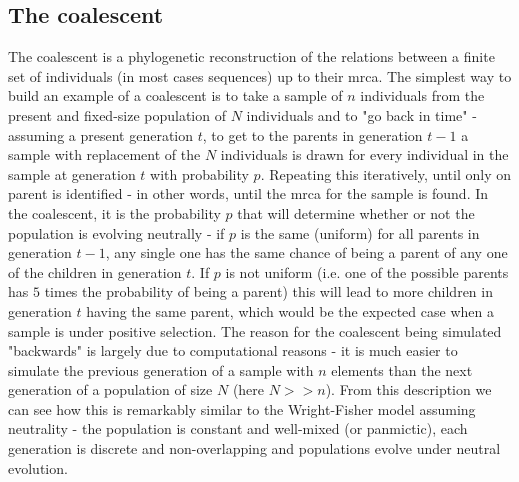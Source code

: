 \subsection{The coalescent}

The coalescent is a phylogenetic reconstruction of the relations between a finite set of individuals (in most cases sequences) up to their \ac{mrca}. The simplest way to build an example of a coalescent is to take a sample of $n$ individuals from the present and fixed-size population of $N$ individuals and to "go back in time" - assuming a present generation $t$, to get to the parents in generation $t-1$ a sample with replacement of the $N$ individuals is drawn for every individual in the sample at generation $t$ with probability $p$. Repeating this iteratively, until only on parent is identified - in other words, until the \ac{mrca} for the sample is found. In the coalescent, it is the probability $p$ that will determine whether or not the population is evolving neutrally - if $p$ is the same (uniform) for all parents in generation $t-1$, any single one has the same chance of being a parent of any one of the children in generation $t$. If $p$ is not uniform (i.e. one of the possible parents has $5$ times the probability of being a parent) this will lead to more children in generation $t$ having the same parent, which would be the expected case when a sample is under positive selection. The reason for the coalescent being simulated "backwards" is largely due to computational reasons - it is much easier to simulate the previous generation of a sample with $n$ elements than the next generation of a population of size $N$ (here $N>>n$). From this description we can see how this is remarkably similar to the Wright-Fisher model assuming neutrality - the population is constant and well-mixed (or panmictic), each generation is discrete and non-overlapping and populations evolve under neutral evolution. 

